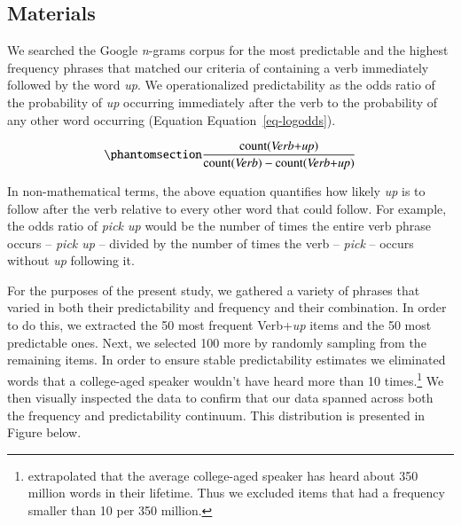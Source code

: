 \documentclass[
  authoryear,
  preprint,
  1p,
  onecolumn]{elsarticle}
\begin{document}
\subsection{Materials}\label{materials}

We searched the Google \emph{n}-grams corpus
\citep{linSyntacticAnnotationsGoogle2012} for the most predictable and
the highest frequency phrases that matched our criteria of containing a
verb immediately followed by the word \emph{up}. We operationalized
predictability as the odds ratio of the probability of \emph{up}
occurring immediately after the verb to the probability of any other
word occurring (Equation Equation~\ref{eq-logodds}).

\begin{equation}\phantomsection\label{eq-logodds}{
\frac{\mathrm{count(\textit{Verb+up})}}{\mathrm{count(\textit{Verb})} - \mathrm{count(\textit{Verb+up})}} 
}\end{equation}

In non-mathematical terms, the above equation quantifies how likely
\emph{up} is to follow after the verb relative to every other word that
could follow. For example, the odds ratio of \emph{pick up} would be the
number of times the entire verb phrase occurs -- \emph{pick up} --
divided by the number of times the verb -- \emph{pick} -- occurs without
\emph{up} following it.

For the purposes of the present study, we gathered a variety of phrases
that varied in both their predictability and frequency and their
combination. In order to do this, we extracted the 50 most frequent
Verb+\emph{up} items and the 50 most predictable ones. Next, we selected
100 more by randomly sampling from the remaining items. In order to
ensure stable predictability estimates we eliminated words that a
college-aged speaker wouldn't have heard more than 10 times.\footnote{\citet{levyProcessingExtraposedStructures2012}
  extrapolated that the average college-aged speaker has heard about 350
  million words in their lifetime. Thus we excluded items that had a
  frequency smaller than 10 per 350 million.} We then visually inspected
the data to confirm that our data spanned across both the frequency and
predictability continuum. This distribution is presented in Figure
\citet{fig} below.
\end{document}
